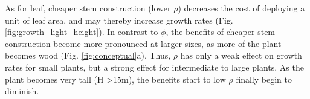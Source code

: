 \documentclass[a4paper,11pt]{article}
\begin{document}

As for leaf, cheaper stem construction (lower $\rho$) decreases the cost of deploying a unit of leaf area, and may thereby increase growth rates (Fig. \ref{fig:growth_light_height}). In contrast to $\phi$, the benefits of cheaper stem construction become more pronounced at larger sizes, as more of the plant becomes wood (Fig. \ref{fig:conceptual}a). Thus, $\rho$ has only a weak effect on growth rates for small plants, but a strong effect for intermediate to large plants. As the plant becomes very tall (H \textgreater 15m), the benefits start to low $\rho$ finally begin to diminish.
\end{document}
